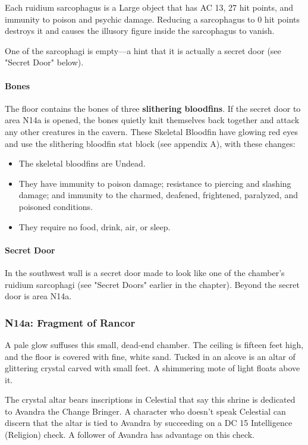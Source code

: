 \documentclass[10pt,a4paper,twoside,twocolumn,openany,nodeprecatedcode]{dndbook}
\begin{document}
Each ruidium sarcophagus is a Large object that has AC 13, 27 hit points, and immunity to poison and psychic damage. Reducing a sarcophagus to 0 hit points destroys it and causes the illusory figure inside the sarcophagus to vanish.

One of the sarcophagi is empty—a hint that it is actually a secret door (see "Secret Door" below).

\paragraph{Bones}
The floor contains the bones of three \textbf{slithering bloodfins}. If the secret door to area N14a is opened, the bones quietly knit themselves back together and attack any other creatures in the cavern. These Skeletal Bloodfin have glowing red eyes and use the slithering bloodfin stat block (see appendix A), with these changes:


\begin{itemize}
\item The skeletal bloodfins are Undead.
\item They have immunity to poison damage; resistance to piercing and slashing damage; and immunity to the charmed, deafened, frightened, paralyzed, and poisoned conditions.
\item They require no food, drink, air, or sleep.
\end{itemize}

\paragraph{Secret Door}
In the southwest wall is a secret door made to look like one of the chamber's ruidium sarcophagi (see "Secret Doors" earlier in the chapter). Beyond the secret door is area N14a.

\subsubsection{N14a: Fragment of Rancor}
\begin{DndReadAloud}{}
A pale glow suffuses this small, dead-end chamber. The ceiling is fifteen feet high, and the floor is covered with fine, white sand. Tucked in an alcove is an altar of glittering crystal carved with small feet. A shimmering mote of light floats above it.

\end{DndReadAloud}

The crystal altar bears inscriptions in Celestial that say this shrine is dedicated to Avandra the Change Bringer. A character who doesn't speak Celestial can discern that the altar is tied to Avandra by succeeding on a DC 15 Intelligence (Religion) check. A follower of Avandra has advantage on this check.
\end{document}
